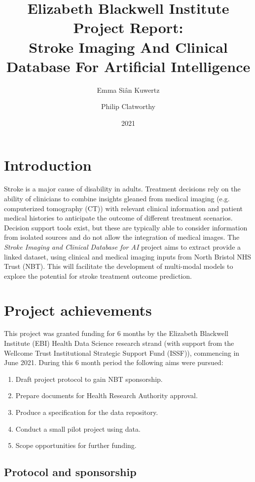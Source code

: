 \documentclass{article}
\title{
  Elizabeth Blackwell Institute Project Report:\\
  Stroke Imaging And Clinical Database For Artificial
  Intelligence
}
\author[1]{Emma Si\^{a}n Kuwertz}
\author[2,3]{Philip Clatworthy}
\affil[1]{Jean Golding Institute, University of Bristol}
\affil[2]{North Bristol NHS Trust}
\affil[3]{Bristol Medical School, University of Bristol}
\date{2021}
\begin{document}
\maketitle
\section{Introduction}

Stroke is a major cause of disability in adults. Treatment
decisions rely on the ability of clinicians to combine insights
gleaned from medical imaging (e.g. computerized tomography (CT)) with
relevant clinical information and patient medical histories to anticipate the outcome of different treatment
scenarios. Decision support tools exist, but these are typically able
to consider information from isolated sources and do not allow the
integration of medical images. The \textit{Stroke Imaging and Clinical
Database for AI} project aims to extract provide a linked dataset,
using clinical and medical imaging inputs from North Bristol NHS Trust (NBT). 
This will facilitate the development of multi-modal models to explore the potential for stroke treatment outcome
prediction.\\



\section{Project achievements}

This project was granted funding for 6 months by the Elizabeth
Blackwell Institute (EBI) Health Data Science research strand (with
support from the Wellcome Trust Institutional Strategic Support Fund
(ISSF)), commencing in June 2021. During this 6 month period the
following aims were pursued:
\begin{enumerate}
\item Draft project protocol to gain NBT sponsorship.
\item Prepare documents for Health Research Authority approval.
\item Produce a specification for the data repository.
\item Conduct a small pilot project using data.
\item Scope opportunities for further funding.
\end{enumerate}

\subsection{Protocol and sponsorship}
\end{document}
